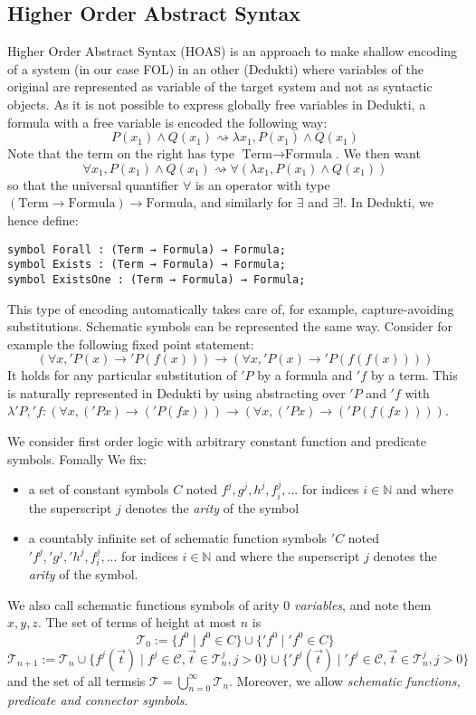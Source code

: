 \documentclass{article}
\newcommand{\Term}{\text{Term}}
\newcommand{\Formula}{\text{Formula}}
\begin{document}
	\subsection{Higher Order Abstract Syntax}
	Higher Order Abstract Syntax (HOAS) is an approach to make shallow encoding of a system (in our case FOL) in an other (Dedukti) where variables of the original are represented as variable of the target system and not as syntactic objects. As it is not possible to express globally free variables in Dedukti, a formula with a free variable is encoded the following way:
	$$
	P(x_1) \land Q(x_1) \rightsquigarrow \lambda x_1 ,  P(x_1) \land Q(x_1)
	$$
	Note that the term on the right has type $\Term \rightarrow \Formula$. We then want
	$$
	\forall x_1, P(x_1) \land Q(x_1) \rightsquigarrow \forall (\lambda x_1 ,  P(x_1) \land Q(x_1))
	$$
	so that the universal quantifier $\forall$ is an operator with type $(\Term \rightarrow \Formula) \rightarrow \Formula$, and similarly for $\exists$ and $\exists !$. In Dedukti, we hence define:
	\begin{lstlisting}[language=Dialekto]
symbol Forall : (Term → Formula) → Formula;
symbol Exists : (Term → Formula) → Formula;
symbol ExistsOne : (Term → Formula) → Formula;
\end{lstlisting}
This type of encoding automatically takes care of, for example, capture-avoiding substitutions. Schematic symbols can be represented the same way. Consider for example the following fixed point statement:
$$
	(\forall x, 'P(x) \rightarrow 'P(f(x))) \rightarrow (\forall x, 'P(x) \rightarrow 'P(f(f(x))))
$$
It holds for any particular substitution of $'P$ by a formula and $'f$ by a term. This is naturally represented in Dedukti by using abstracting over $'P$ and $'f$ with $\lambda 'P, 'f: (\forall x, ('P x) \rightarrow ('P(f x))) \rightarrow (\forall x, ('P x) \rightarrow ('P (f (f x))))$.
	
	\iffalse
	We consider first order logic with arbitrary constant function and predicate symbols. Fomally We fix:
	\begin{itemize}
		\item a set of constant symbols $C$ noted $f^j, g^j, h^j, f^j_i,...$ for indices $i\in \mathbb{N}$ and where the superscript $j$ denotes the \textit{arity} of the symbol
		\item a countably infinite set of schematic function symbols $'C$ noted $ 'f^j, 'g^j, 'h^j, f^j_i,...$ for indices $i\in \mathbb{N}$ and where the superscript $j$ denotes the \textit{arity} of the symbol.
	\end{itemize}
	We also call schematic functions symbols of arity 0 \textit{variables}, and note them $x,y,z$.
	The set of terms of height at most $n$ is
	$$\mathcal{T}_0 := \lbrace f^0 \mid f^0 \in C\rbrace \cup \lbrace 'f^0 \mid 'f^0 \in C \rbrace$$
	$$\mathcal{T}_{n+1} := \mathcal{T}_n \cup \lbrace f^j(\vec{t}) \mid f^j\in \mathcal{C}, \vec{t}\in \mathcal{T}_n^j, j>0 \rbrace \cup \lbrace 'f^j(\vec{t}) \mid 'f^j\in \mathcal{C}, \vec{t}\in \mathcal{T}_n^j, j>0 \rbrace$$
	and the set of all termsis $\mathcal T = \bigcup_{n=0}^\infty \mathcal{T}_n$.  Moreover, we allow \textit{schematic functions, predicate and connector symbols}.
	
\end{document}
